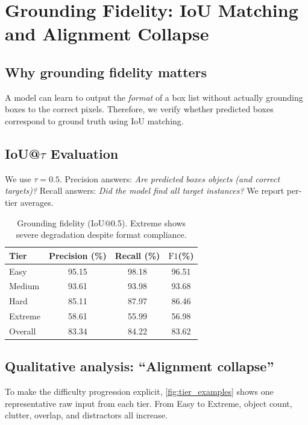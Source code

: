 \documentclass[10pt]{article}
\newcommand{\iou}{\ensuremath{\mathrm{IoU}}\xspace}
\newcommand{\fOne}{\ensuremath{\mathrm{F1}}\xspace}
\newcommand{\tauIoU}{0.5}
\begin{document}
\section{Grounding Fidelity: IoU Matching and Alignment Collapse}
\subsection{Why grounding fidelity matters}
A model can learn to output the \emph{format} of a box list without actually grounding boxes to the correct pixels.
Therefore, we verify whether predicted boxes correspond to ground truth using \iou matching.

\subsection{IoU@$\tau$ Evaluation}
We use $\tau=\tauIoU$.
Precision answers: \emph{Are predicted boxes objects (and correct targets)?}
Recall answers: \emph{Did the model find all target instances?}
We report per-tier averages.

\begin{table}[t]
  \centering
  \small
  \setlength{\tabcolsep}{6pt}
  \begin{tabular}{lccc}
    \toprule
    \textbf{Tier} & \textbf{Precision (\%)} & \textbf{Recall (\%)} & \textbf{\fOne (\%)} \\
    \midrule
    Easy     & 95.15 & 98.18 & 96.51 \\
    Medium   & 93.61 & 93.98 & 93.68 \\
    Hard     & 85.11 & 87.97 & 86.46 \\
    Extreme  & 58.61 & 55.99 & 56.98 \\
    \midrule
    Overall  & 83.34 & 84.22 & 83.62 \\
    \bottomrule
  \end{tabular}
  \caption{Grounding fidelity (IoU@0.5). Extreme shows severe degradation despite format compliance.}
  \label{tab:iou}
\end{table}

\subsection{Qualitative analysis: ``Alignment collapse''}
To make the difficulty progression explicit, \cref{fig:tier_examples} shows one representative raw input from each tier.
From Easy to Extreme, object count, clutter, overlap, and distractors all increase.
\end{document}
